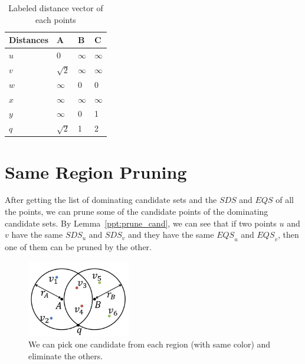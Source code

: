 \begin{table}[h]
    \centering
    \begin{tabular}{llll}
    \hline
    Distances & A & B & C \\ \hline
    $u$       & 0 & $\infty$ & $\infty$ \\ \hline
    $v$       & $\sqrt{2}$ & $\infty$ & $\infty$ \\ \hline
    $w$       & $\infty$ & 0 & 0 \\ \hline
    $x$       & $\infty$ & $\infty$ & $\infty$ \\ \hline
    $y$       & $\infty$ & 0 & 1 \\ \hline
    $q$       & $\sqrt{2}$ & 1 & 2 \\ \hline
    \end{tabular}
    \caption{Labeled distance vector of each points}
    \label{tab:lv_spatial}
\end{table}

\section{Same Region Pruning}
After getting the list of dominating candidate sets and the $\mathit{SDS}$ and $\mathit{EQS}$ of all the points, we can prune some of the candidate points of the dominating candidate sets. By Lemma~\ref{ppt:prune_cand}, we can see that if two points $u$ and $v$ have the same $\mathit{SDS}_u$ and $\mathit{SDS}_v$ and they have the same $\mathit{EQS}_u$ and $\mathit{EQS}_v$, then one of them can be pruned by the other.

\begin{figure}[h]
    \centering
      \includegraphics[width=0.4\textwidth]{figs/Circle_Spatial_Example}
    \caption{We can pick one candidate from each region (with same color) and eliminate the others.}
    \label{fig:circle_example}
\end{figure}

